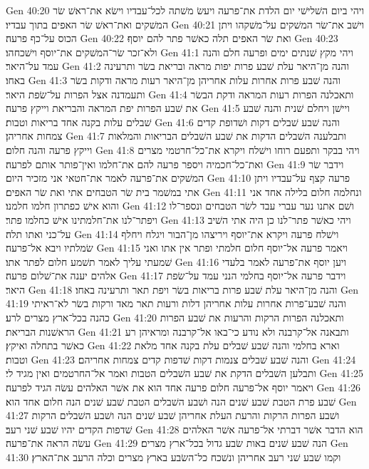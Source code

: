 Gen 40:20  ויהי ביום השׁלישׁי יום הלדת את־פרעה ויעשׂ משׁתה לכל־עבדיו וישׂא את־ראשׁ שׂר המשׁקים ואת־ראשׁ שׂר האפים בתוך עבדיו׃
Gen 40:21  וישׁב את־שׂר המשׁקים על־משׁקהו ויתן הכוס על־כף פרעה׃
Gen 40:22  ואת שׂר האפים תלה כאשׁר פתר להם יוסף׃
Gen 40:23  ולא־זכר שׂר־המשׁקים את־יוסף וישׁכחהו׃
Gen 41:1  ויהי מקץ שׁנתים ימים ופרעה חלם והנה עמד על־היאר׃
Gen 41:2  והנה מן־היאר עלת שׁבע פרות יפות מראה ובריאת בשׂר ותרעינה באחו׃
Gen 41:3  והנה שׁבע פרות אחרות עלות אחריהן מן־היאר רעות מראה ודקות בשׂר ותעמדנה אצל הפרות על־שׂפת היאר׃
Gen 41:4  ותאכלנה הפרות רעות המראה ודקת הבשׂר את שׁבע הפרות יפת המראה והבריאת וייקץ פרעה׃
Gen 41:5  ויישׁן ויחלם שׁנית והנה שׁבע שׁבלים עלות בקנה אחד בריאות וטבות׃
Gen 41:6  והנה שׁבע שׁבלים דקות ושׁדופת קדים צמחות אחריהן׃
Gen 41:7  ותבלענה השׁבלים הדקות את שׁבע השׁבלים הבריאות והמלאות וייקץ פרעה והנה חלום׃
Gen 41:8  ויהי בבקר ותפעם רוחו וישׁלח ויקרא את־כל־חרטמי מצרים ואת־כל־חכמיה ויספר פרעה להם את־חלמו ואין־פותר אותם לפרעה׃
Gen 41:9  וידבר שׂר המשׁקים את־פרעה לאמר את־חטאי אני מזכיר היום׃
Gen 41:10  פרעה קצף על־עבדיו ויתן אתי במשׁמר בית שׂר הטבחים אתי ואת שׂר האפים׃
Gen 41:11  ונחלמה חלום בלילה אחד אני והוא אישׁ כפתרון חלמו חלמנו׃
Gen 41:12  ושׁם אתנו נער עברי עבד לשׂר הטבחים ונספר־לו ויפתר־לנו את־חלמתינו אישׁ כחלמו פתר׃
Gen 41:13  ויהי כאשׁר פתר־לנו כן היה אתי השׁיב על־כני ואתו תלה׃
Gen 41:14  וישׁלח פרעה ויקרא את־יוסף ויריצהו מן־הבור ויגלח ויחלף שׂמלתיו ויבא אל־פרעה׃
Gen 41:15  ויאמר פרעה אל־יוסף חלום חלמתי ופתר אין אתו ואני שׁמעתי עליך לאמר תשׁמע חלום לפתר אתו׃
Gen 41:16  ויען יוסף את־פרעה לאמר בלעדי אלהים יענה את־שׁלום פרעה׃
Gen 41:17  וידבר פרעה אל־יוסף בחלמי הנני עמד על־שׂפת היאר׃
Gen 41:18  והנה מן־היאר עלת שׁבע פרות בריאות בשׂר ויפת תאר ותרעינה באחו׃
Gen 41:19  והנה שׁבע־פרות אחרות עלות אחריהן דלות ורעות תאר מאד ורקות בשׂר לא־ראיתי כהנה בכל־ארץ מצרים לרע׃
Gen 41:20  ותאכלנה הפרות הרקות והרעות את שׁבע הפרות הראשׁנות הבריאת׃
Gen 41:21  ותבאנה אל־קרבנה ולא נודע כי־באו אל־קרבנה ומראיהן רע כאשׁר בתחלה ואיקץ׃
Gen 41:22  וארא בחלמי והנה שׁבע שׁבלים עלת בקנה אחד מלאת וטבות׃
Gen 41:23  והנה שׁבע שׁבלים צנמות דקות שׁדפות קדים צמחות אחריהם׃
Gen 41:24  ותבלען השׁבלים הדקת את שׁבע השׁבלים הטבות ואמר אל־החרטמים ואין מגיד לי׃
Gen 41:25  ויאמר יוסף אל־פרעה חלום פרעה אחד הוא את אשׁר האלהים עשׂה הגיד לפרעה׃
Gen 41:26  שׁבע פרת הטבת שׁבע שׁנים הנה ושׁבע השׁבלים הטבת שׁבע שׁנים הנה חלום אחד הוא׃
Gen 41:27  ושׁבע הפרות הרקות והרעת העלת אחריהן שׁבע שׁנים הנה ושׁבע השׁבלים הרקות שׁדפות הקדים יהיו שׁבע שׁני רעב׃
Gen 41:28  הוא הדבר אשׁר דברתי אל־פרעה אשׁר האלהים עשׂה הראה את־פרעה׃
Gen 41:29  הנה שׁבע שׁנים באות שׂבע גדול בכל־ארץ מצרים׃
Gen 41:30  וקמו שׁבע שׁני רעב אחריהן ונשׁכח כל־השׂבע בארץ מצרים וכלה הרעב את־הארץ׃
